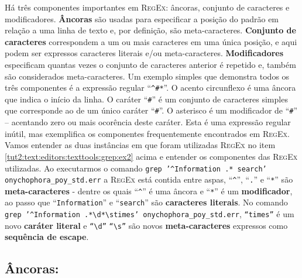 \begin{refsection}
Há três componentes importantes em \textsc{RegEx}: âncoras, conjunto de caracteres e modificadores. \textbf{Âncoras} são usadas para especificar a posição do padrão em relação a uma linha de texto e, por definição, são meta-caracteres. \textbf{Conjunto de caracteres} correspondem a um ou mais caracteres em uma única posição, e aqui podem ser expressos caracteres literais e/ou meta-caracteres. \textbf{Modificadores} especificam quantas vezes o conjunto de caracteres anterior é repetido e, também são considerados meta-caracteres. Um exemplo simples que demonstra todos os três componentes é a expressão regular ``\texttt{\^{}\#*}''. O acento circunflexo é uma âncora que indica o início da linha. O caráter ``\texttt{\#}'' é um conjunto de caracteres simples que corresponde ao de um único caráter ``\texttt{\#}''. O asterisco é um modificador de ``\texttt{\#}'' -- acentando zero ou mais ocorência deste caráter. Esta é uma expressão regular inútil, mas exemplifica os componentes frequentemente encontrados em \textsc{RegEx}.\\

Vamos entender as duas instâncias em que foram utilizadas \textsc{RegEx} no item \ref{tut2:text:editors:texttools:grep:ex2} acima e entender os componentes das \textsc{RegEx} utilizadas. Ao executarmos o comando  \texttt{grep '\^{}Information .* search' onychophora\_poy\_std.err} a \textsc{RegEx} está contida entre aspas, ``\texttt{\^{}}'', ``\texttt{.}'' e ``\texttt{*}'' são \textbf{meta-caracteres} - dentre os quais ``\texttt{\^{}}'' é uma âncora e ``\texttt{*}'' é um \textbf{modificador}, ao passo que ``\texttt{Information}'' e ``\texttt{search}'' são \textbf{caracteres literais}. No comando \texttt{grep '\^{}Information .*\textbackslash d*\textbackslash stimes' onychophora\_poy\_std.err}, \texttt{``times''} é um novo \textbf{caráter literal} e \texttt{``\textbackslash d''} \texttt{``\textbackslash s''} são novos \textbf{meta-caracteres} expressos como \textbf{sequência de escape}.\\

\subsection{Âncoras:}\label{tut2:regex:anchor}


\end{refsection}
